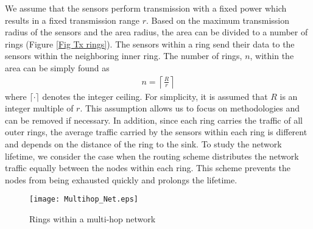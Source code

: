 \documentclass[conference]{IEEEtran}
\begin{document}
We assume that the sensors perform transmission with a fixed power
which results in a fixed transmission range $r$. Based on the
maximum transmission radius of the sensors and the area radius, the
area can be divided to a number of rings (Figure \ref{Fig Tx
rings}). The sensors within a ring send their data to the sensors
within the neighboring inner ring. The number of rings, $n$, within
the area can be simply found as
\begin{align} \label{Number of tiers}
n = \left \lceil \frac{R}{r} \right \rceil
\end{align}
where $\lceil \cdot \rceil$ denotes the integer ceiling. For
simplicity, it is assumed that $R$ is an integer multiple of $r$.
This assumption allows us to focus on methodologies and can be
removed if necessary. In addition, since each ring carries the
traffic of all outer rings, the average traffic carried by the
sensors within each ring is different and depends on the distance of
the ring to the sink. To study the network lifetime, we consider the
case when the routing scheme distributes the network traffic equally
between the nodes within each ring. This scheme prevents the nodes
from being exhausted quickly and prolongs the lifetime.

\begin{figure}[!h]
\centering
\texttt{[image: Multihop\_Net.eps]}
\caption{Rings within a multi-hop network} \label{Fig Tx rings}
\end{figure}
\end{document}
